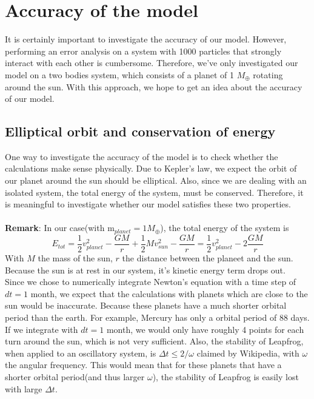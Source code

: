 \section{Accuracy of the model}
It is certainly important to investigate the accuracy of our model. However, performing an error analysis on a system with 1000 particles that strongly interact with each other is cumbersome. Therefore, we've only investigated our model on a two bodies system, which consists of a planet of 1 $M_{\oplus}$ rotating around the sun. With this approach, we hope to get an idea about the accuracy of our model.
\subsection{Elliptical orbit and conservation of energy}
One way to investigate the accuracy of the model is to check whether the calculations make sense physically. Due to Kepler's law, we expect the orbit of our planet around the sun should be elliptical. Also, since we are dealing with an isolated system, the total energy of the system, must be conserved. Therefore, it is meaningful to investigate whether our model satisfies these two properties.\\ 
\\
\textbf{Remark}: In our case(with $\text{m}_{planet}=1 M_{\oplus}$), the total energy of the system is
\[E_{tot}=\frac{1}{2}v_{planet}^2-\frac{GM}{r}+\frac{1}{2}Mv_{sun}^2-\frac{GM}{r}=\frac{1}{2}v_{planet}^2-2\frac{GM}{r}\]
With $M$ the mass of the sun, $r$ the distance between the planeet and the sun. Because the sun is at rest in our system, it's kinetic energy term drops out.\\


Since we chose to numerically integrate Newton's equation with a time step of $dt=1$ month, we expect that the calculations with planets which are close to the sun would be inaccurate. Because these planets have a much shorter orbital period than the earth. For example, Mercury has only a orbital period of 88 days. If we integrate with $dt=1$ month, we would only have roughly 4 points for each turn around the sun, which is not very sufficient. Also, the stability of Leapfrog, when applied to an oscillatory system, is $\Delta t\leq 2/\omega$ claimed by Wikipedia, with $\omega$ the angular frequency. This would mean that for these planets that have a shorter orbital period(and thus larger $\omega$), the stability of Leapfrog is easily lost with large $\Delta t$.\\

